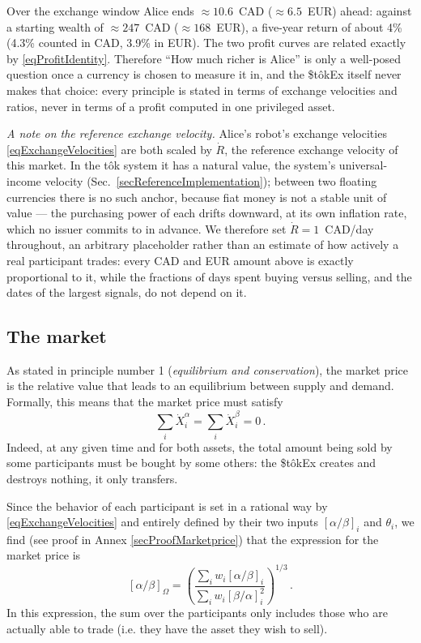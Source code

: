 \documentclass[letterpaper]{article}
\newcommand{\priceAB}{\left[\alpha / \beta\right]}
\newcommand{\priceBA}{\left[\beta / \alpha\right]}
\newcommand{\StokEx}{\$t\^{o}kEx}
\newcommand{\tok}{t\^{o}k}
\begin{document}
Over the exchange window Alice ends $\approx10.6$~CAD ($\approx6.5$~EUR) ahead: against a starting wealth of $\approx247$~CAD ($\approx168$~EUR), a five-year return of about 4\% (4.3\% counted in CAD, 3.9\% in EUR). The two profit curves are related exactly by \eqref{eqProfitIdentity}. Therefore ``How much richer is Alice'' is only a well-posed question once a currency is chosen to measure it in, and the \StokEx{} itself never makes that choice: every principle is stated in terms of exchange velocities and ratios, never in terms of a profit computed in one privileged asset.

\emph{A note on the reference exchange velocity.} Alice's robot's exchange velocities \eqref{eqExchangeVelocities} are both scaled by $\dot{R}$, the reference exchange velocity of this market. In the \tok{} system it has a natural value, the system's universal-income velocity (Sec.~\ref{secReferenceImplementation}); between two floating currencies there is no such anchor, because fiat money is not a stable unit of value --- the purchasing power of each drifts downward, at its own inflation rate, which no issuer commits to in advance. We therefore set $\dot{R} = 1$~CAD/day throughout, an arbitrary placeholder rather than an estimate of how actively a real participant trades: every CAD and EUR amount above is exactly proportional to it, while the fractions of days spent buying versus selling, and the dates of the largest signals, do not depend on it.

\subsection{The market}\label{secMarketPrice}

As stated in principle number 1 (\emph{equilibrium and conservation}), the market price is the relative value that leads to an equilibrium between supply and demand. Formally, this means that the market price must satisfy
\begin{equation}
    \sum_i \dot{X}_i^\alpha = \sum_i \dot{X}_i^\beta = 0 \,. \label{eqEquilibrium}
\end{equation}
Indeed, at any given time and for both assets, the total amount being sold by some participants must be bought by some others: the \StokEx{} creates and destroys nothing, it only transfers.

Since the behavior of each participant is set in a rational way by \eqref{eqExchangeVelocities} and entirely defined by their two inputs $\priceAB_i$ and $\theta_i$, we find (see proof in Annex \ref{secProofMarketprice}) that the expression for the market price is
\begin{equation}
    \priceAB_\Omega = \left( \frac{\displaystyle \sum_i w_i \priceAB_i}{\displaystyle \sum_i w_i \priceBA_i^2}\right)^{1/3}\,. \label{eqMarketPrice}
\end{equation}
In this expression, the sum over the participants only includes those who are actually able to trade (i.e. they have the asset they wish to sell).
\end{document}
